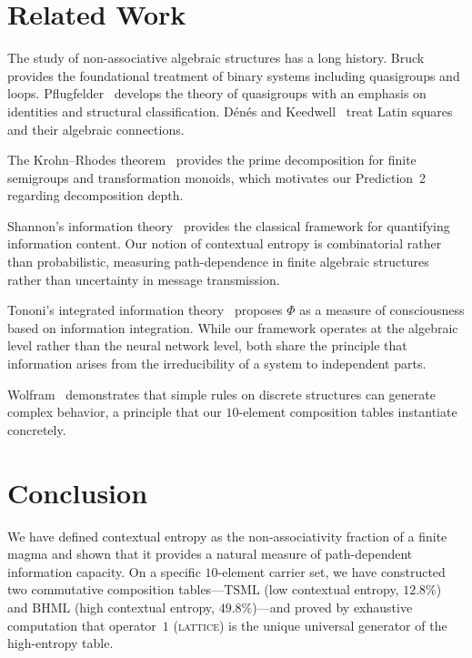 \documentclass[11pt,a4paper]{article}
\theoremstyle{definition}
\theoremstyle{remark}
\newcommand{\TSML}{\mathrm{TSML}}
\newcommand{\BHML}{\mathrm{BHML}}
\begin{document}
\section{Related Work}\label{sec:related}

The study of non-associative algebraic structures has a long history. Bruck~\cite{Bruck1958} provides the foundational treatment of binary systems including quasigroups and loops. Pflugfelder~\cite{Pflugfelder1990} develops the theory of quasigroups with an emphasis on identities and structural classification. D\'en\'es and Keedwell~\cite{DenesKeedwell1974} treat Latin squares and their algebraic connections.

The Krohn--Rhodes theorem~\cite{KrohnRhodes1965} provides the prime decomposition for finite semigroups and transformation monoids, which motivates our Prediction~2 regarding decomposition depth.

Shannon's information theory~\cite{Shannon1948} provides the classical framework for quantifying information content. Our notion of contextual entropy is combinatorial rather than probabilistic, measuring path-dependence in finite algebraic structures rather than uncertainty in message transmission.

Tononi's integrated information theory~\cite{Tononi2004} proposes $\Phi$ as a measure of consciousness based on information integration. While our framework operates at the algebraic level rather than the neural network level, both share the principle that information arises from the irreducibility of a system to independent parts.

Wolfram~\cite{Wolfram2002} demonstrates that simple rules on discrete structures can generate complex behavior, a principle that our $10$-element composition tables instantiate concretely.

\section{Conclusion}\label{sec:conclusion}

We have defined contextual entropy as the non-associativity fraction of a finite magma and shown that it provides a natural measure of path-dependent information capacity. On a specific $10$-element carrier set, we have constructed two commutative composition tables---$\TSML$ (low contextual entropy, $12.8\%$) and $\BHML$ (high contextual entropy, $49.8\%$)---and proved by exhaustive computation that operator~$1$ (\textsc{lattice}) is the unique universal generator of the high-entropy table.
\end{document}
